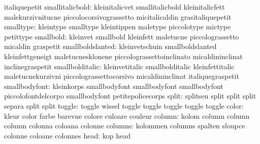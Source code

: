                            italiquepetit
          smallitalicbold: kleinitalicvet            smallitalicbold
                           kleinitalicfett           malekurzivnitucne
                           piccolocorsivograssetto   micitalicaldin
                           grasitaliquepetit
                smalltype: kleintype                 smalltype
                           kleintippen               maletype
                           piccolotype               mictype
                           petittype
                smallbold: kleinvet                  smallbold
                           kleinfett                 maletucne
                           piccolograssetto          micaldin
                           graspetit
         smallboldslanted: kleinvetschuin            smallboldslanted
                           kleinfettgeneigt          maletucnesklonene
                           piccolograssettoinclinato micaldininclinat
                           inclinegraspetit
          smallbolditalic: kleinvetitalic            smallbolditalic
                           kleinfettitalic           maletucnekurzivni
                           piccolograssettocorsivo   micaldininclinat
                           italiquegraspetit
            smallbodyfont: kleinkorps                smallbodyfont
                           smallbodyfont             smallbodyfont
                           piccolofontdelcorpo       smallbodyfont
                           petitepolicecorps
                    split: splitsen                  split
                           split                     split
                           separa                    split
                           split
                   toggle: toggle                    wissel
                           toggle                    toggle
                           toggle                    toggle
                           toggle
                    color: kleur                     color
                           farbe                     barevne
                           colore                    culoare
                           couleur
                   column: kolom                     column
                           column                    column
                           colonna                   coloana
                           colonne
                  columns: kolommen                  columns
                           spalten                   sloupce
                           colonne                   coloane
                           colonnes
                     head: kop                       head
